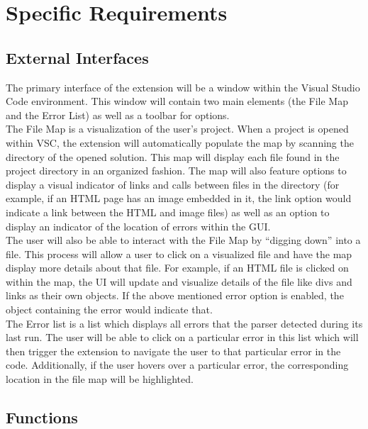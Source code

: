 \documentclass[letterpaper,10pt,titlepage,draftclsnofoot,onecolumn,onesided] {IEEEtran}
\begin{document}
\section{Specific Requirements}

\subsection{External Interfaces}
The primary interface of the extension will be a window within the Visual Studio Code environment.
This window will contain two main elements (the File Map and the Error List) as well as a toolbar for options.
\\
The File Map is a visualization of the user's project.
When a project is opened within VSC, the extension will automatically populate the map by scanning the directory of the opened solution. 
This map will display each file found in the project directory in an organized fashion.
The map will also feature options to display a visual indicator of links and calls between files in the directory (for example, if an HTML page has an image embedded in it, the link option would indicate a link between the HTML and image files) as well as an option to display an indicator of the location of errors within the GUI.
\\
The user will also be able to interact with the File Map by ``digging down'' into a file.
This process will allow a user to click on a visualized file and have the map display more details about that file. 
For example, if an HTML file is clicked on within the map, the UI will update and visualize details of the file like divs and links as their own objects.
If the above mentioned error option is enabled, the object containing the error would indicate that.
\\
The Error list is a list which displays all errors that the parser detected during its last run.
The user will be able to click on a particular error in this list which will then trigger the extension to navigate the user to that particular error in the code. Additionally, if the user hovers over a particular error, the corresponding location in the file map will be highlighted.

\subsection{Functions}
\end{document}

